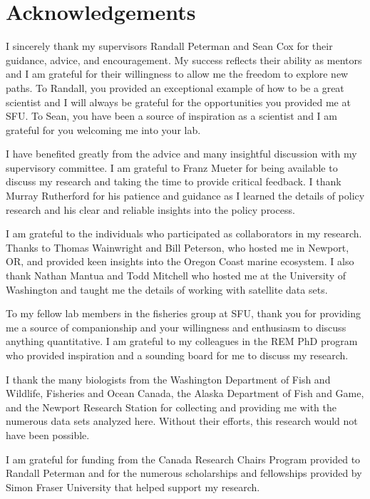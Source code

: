 

\chapter*{Acknowledgements}

I sincerely thank my supervisors Randall Peterman and Sean Cox for their
guidance, advice, and encouragement. My success reflects their ability as
mentors and I am grateful for their willingness to allow me the freedom to
explore new paths. To Randall, you provided an exceptional example of how to be
a great scientist and I will always be grateful for the opportunities you
provided me at SFU. To Sean, you have been a source of inspiration as a
scientist and I am grateful for you welcoming me into your lab.

I have benefited greatly from the advice and many insightful discussion with my
supervisory committee. I am grateful to Franz Mueter for being available to
discuss my research and taking the time to provide critical feedback. I thank
Murray Rutherford for his patience and guidance as I learned the details of
policy research and his clear and reliable insights into the policy process.

I am grateful to the individuals who participated as collaborators in my
research. Thanks to Thomas Wainwright and Bill Peterson, who hosted me in
Newport, OR, and provided keen insights into the Oregon Coast marine ecosystem.
I also thank Nathan Mantua and Todd Mitchell who hosted me at the University of
Washington and taught me the details of working with satellite data sets.

To my fellow lab members in the fisheries group at SFU, thank you for providing
me a source of companionship and your willingness and enthusiasm to discuss
anything quantitative. I am grateful to my colleagues in the REM PhD program who
provided inspiration and a sounding board for me to discuss my research.

I thank the many biologists from the Washington Department of Fish and Wildlife,
Fisheries and Ocean Canada, the Alaska Department of Fish and Game, and the
Newport Research Station for collecting and providing me with the numerous data
sets analyzed here. Without their efforts, this research would not have been
possible.

I am grateful for funding from the Canada Research Chairs Program provided to
Randall Peterman and for the numerous scholarships and fellowships provided by
Simon Fraser University that helped support my research.

